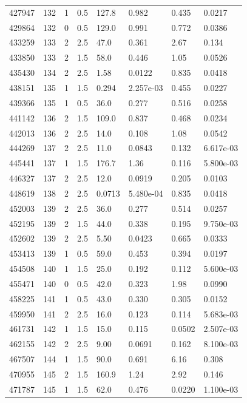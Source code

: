 \documentclass[preview]{standalone}
\begin{document}
{{{{{{\begin{tabular}{L{1.2cm}C{1.2cm} C{0.3cm}C{0.5cm} C{1.4cm}C{1.4cm} C{1.4cm}C{1.4cm}}
  427947  &   132  & 1     & 0.5 &  127.8  & 0.982  & 0.435 &  0.0217   \\ 
  429864  &   132  & 0     & 0.5 &  129.0  & 0.991  & 0.772 &  0.0386   \\ 
  433259  &   133  & 2     & 2.5 &  47.0  & 0.361  & 2.67 &  0.134   \\ 
  433850  &   133  & 2     & 1.5 &  58.0  & 0.446  & 1.05 &  0.0526   \\ 
  435430  &   134  & 2     & 2.5 &  1.58  & 0.0122  & 0.835 &  0.0418   \\ 
  438151  &   135  & 1     & 1.5 &  0.294  & 2.257e-03  & 0.455 &  0.0227   \\ 
  439366  &   135  & 1     & 0.5 &  36.0  & 0.277  & 0.516 &  0.0258   \\ 
  441142  &   136  & 2     & 1.5 &  109.0  & 0.837  & 0.468 &  0.0234   \\ 
  442013  &   136  & 2     & 2.5 &  14.0  & 0.108  & 1.08 &  0.0542   \\ 
  444269  &   137  & 2     & 2.5 &  11.0  & 0.0843  & 0.132 &  6.617e-03   \\ 
  445441  &   137  & 1     & 1.5 &  176.7  & 1.36  & 0.116 &  5.800e-03   \\ 
  446327  &   137  & 2     & 2.5 &  12.0  & 0.0919  & 0.205 &  0.0103   \\ 
  448619  &   138  & 2     & 2.5 &  0.0713  & 5.480e-04  & 0.835 &  0.0418   \\ 
  452003  &   139  & 2     & 2.5 &  36.0  & 0.277  & 0.514 &  0.0257   \\ 
  452195  &   139  & 2     & 1.5 &  44.0  & 0.338  & 0.195 &  9.750e-03   \\ 
  452602  &   139  & 2     & 2.5 &  5.50  & 0.0423  & 0.665 &  0.0333   \\ 
  453413  &   139  & 1     & 0.5 &  59.0  & 0.453  & 0.394 &  0.0197   \\ 
  454508  &   140  & 1     & 1.5 &  25.0  & 0.192  & 0.112 &  5.600e-03   \\ 
  455471  &   140  & 0     & 0.5 &  42.0  & 0.323  & 1.98 &  0.0990   \\ 
  458225  &   141  & 1     & 0.5 &  43.0  & 0.330  & 0.305 &  0.0152   \\ 
  459950  &   141  & 2     & 2.5 &  16.0  & 0.123  & 0.114 &  5.683e-03   \\ 
  461731  &   142  & 1     & 1.5 &  15.0  & 0.115  & 0.0502 &  2.507e-03   \\ 
  462155  &   142  & 2     & 2.5 &  9.00  & 0.0691  & 0.162 &  8.100e-03   \\ 
  467507  &   144  & 1     & 1.5 &  90.0  & 0.691  & 6.16 &  0.308   \\ 
  470955  &   145  & 2     & 1.5 &  160.9  & 1.24  & 2.92 &  0.146   \\ 
  471787  &   145  & 1     & 1.5 &  62.0  & 0.476  & 0.0220 &  1.100e-03   \\ 
\hline 
\end{tabular} 

}}}}}}
\end{document}
